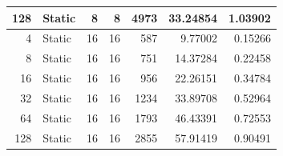 \documentclass[journal,transmag]{IEEEtran}
\begin{document}
\begin{table}[h]
\begin{tabular}{|r|l|r|r|r|r|r|}
		128                           & Static   & 8                          & 8                          & 4973                           & 33.24854                      & 1.03902                         \\ \hline
		4                             & Static   & 16                         & 16                         & 587                            & 9.77002                       & 0.15266                         \\ \hline
		8                             & Static   & 16                         & 16                         & 751                            & 14.37284                      & 0.22458                         \\ \hline
		16                            & Static   & 16                         & 16                         & 956                            & 22.26151                      & 0.34784                         \\ \hline
		32                            & Static   & 16                         & 16                         & 1234                           & 33.89708                      & 0.52964                         \\ \hline
		64                            & Static   & 16                         & 16                         & 1793                           & 46.43391                      & 0.72553                         \\ \hline
		128                           & Static   & 16                         & 16                         & 2855                           & 57.91419                      & 0.90491                         \\ \hline
	\end{tabular}
\end{table}
	\newpage
	
\end{document}
